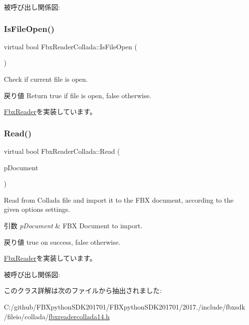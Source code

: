 被呼び出し関係図\+:
\mbox{\label{class_fbx_reader_collada_a6732d6488100827a26065750e80f3a27}} 
\subsubsection{\texorpdfstring{Is\+File\+Open()}{IsFileOpen()}}
{\footnotesize\ttfamily virtual bool Fbx\+Reader\+Collada\+::\+Is\+File\+Open (\begin{DoxyParamCaption}{ }\end{DoxyParamCaption})\hspace{0.3cm}{\ttfamily [virtual]}}

Check if current file is open. \begin{DoxyReturn}{戻り値}
Return true if file is open, false otherwise. 
\end{DoxyReturn}


\hyperlink{class_fbx_reader_af86b437702ffc840cfab52185cbc7232}{Fbx\+Reader}を実装しています。

\mbox{\label{class_fbx_reader_collada_afbffa96769d22d8e5df25c83d15bd8cb}} 
\subsubsection{\texorpdfstring{Read()}{Read()}}
{\footnotesize\ttfamily virtual bool Fbx\+Reader\+Collada\+::\+Read (\begin{DoxyParamCaption}\item[{\hyperlink{class_fbx_document}{Fbx\+Document} $\ast$}]{p\+Document }\end{DoxyParamCaption})\hspace{0.3cm}{\ttfamily [virtual]}}

Read from Collada file and import it to the F\+BX document, according to the given options settings. 
\begin{DoxyParams}{引数}
{\em p\+Document} & F\+BX Document to import. \\
\hline
\end{DoxyParams}
\begin{DoxyReturn}{戻り値}
true on success, false otherwise. 
\end{DoxyReturn}


\hyperlink{class_fbx_reader_a29941746acc73d7ffd2411a9be9d2525}{Fbx\+Reader}を実装しています。

被呼び出し関係図\+:


このクラス詳解は次のファイルから抽出されました\+:\begin{DoxyCompactItemize}
\item 
C\+:/github/\+F\+B\+Xpython\+S\+D\+K201701/\+F\+B\+Xpython\+S\+D\+K201701/2017./include/fbxsdk/fileio/collada/\hyperlink{fbxreadercollada14_8h}{fbxreadercollada14.\+h}\end{DoxyCompactItemize}
